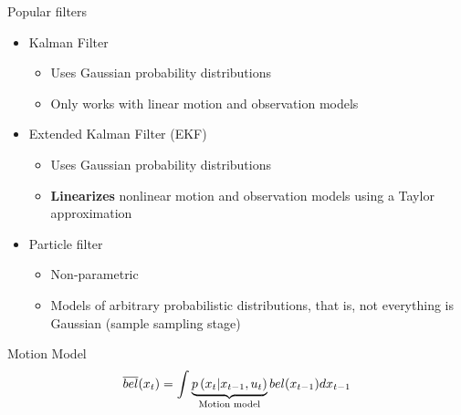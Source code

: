 \begin{frame}{Popular filters}
    \begin{itemize}
    \item Kalman Filter
    \begin{itemize}
    \item Uses Gaussian probability distributions
    \item Only works with linear motion and observation models
    \end{itemize}
    \item Extended Kalman Filter (EKF)
    \begin{itemize}
    \item Uses Gaussian probability distributions
    \item {\bf Linearizes} nonlinear motion and observation models using a Taylor approximation
    \end{itemize} 
    \item Particle filter
     \begin{itemize}
     \item Non-parametric
     \item Models of arbitrary probabilistic distributions, that is, not everything is Gaussian (sample sampling stage)
     \end{itemize}
     \end{itemize}
    
    \end{frame}
    
    \begin{frame}{Motion Model}
     \begin{equation*}
     \overline{bel}(x_{t}) = \int \underbrace{p\left(x_{t} | x_{t-1}, u_{t} \right)}_{\text{Motion model}} bel(x_{t-1}) d x_{t-1}
     \end{equation*}
\end{frame}

